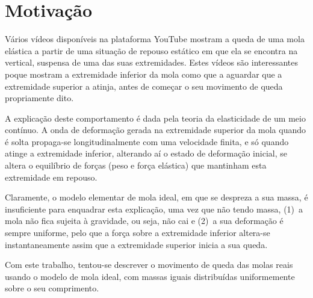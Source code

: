 \documentclass{article}
\begin{document}
\section*{Motivação}
Vários vídeos disponíveis na plataforma YouTube mostram a queda de uma mola
elástica a partir de uma situação de repouso estático em que ela se encontra na
vertical, suspensa de uma das suas extremidades. Estes vídeos são interessantes
poque mostram a extremidade inferior da mola como que a aguardar que a
extremidade superior a atinja, antes de começar o seu movimento de queda
propriamente dito. 

A explicação deste comportamento é dada pela teoria da elasticidade de um meio
contínuo. A onda de deformação gerada na extremidade superior da mola quando é
solta propaga-se longitudinalmente com uma velocidade finita, e só quando atinge
a extremidade inferior, alterando aí o estado de deformação inicial, se altera o
equilíbrio de forças (peso e força elástica) que mantinham esta extremidade em
repouso.

Claramente, o modelo elementar de mola ideal, em que se despreza a sua massa, é
insuficiente para enquadrar esta explicação, uma vez que não tendo massa, (1)~a
mola não fica sujeita à gravidade, ou seja, não cai e (2)~a sua deformação é
sempre uniforme, pelo que a força sobre a extremidade inferior altera-se
instantaneamente assim que a extremidade superior inicia a sua queda. 

Com este trabalho, tentou-se descrever o movimento de queda das molas reais
usando o modelo de mola ideal, com massas iguais distribuídas uniformemente
sobre o seu comprimento.
\end{document}
